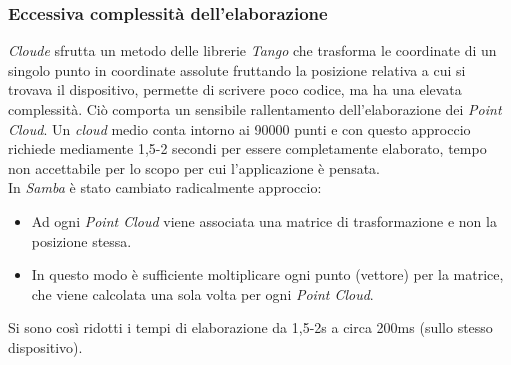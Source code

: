 \subsubsection{Eccessiva complessità dell'elaborazione}
\emph{Cloude} sfrutta un metodo delle librerie \emph{Tango} che trasforma le coordinate di un singolo punto in coordinate assolute fruttando la posizione relativa a cui si trovava il dispositivo, permette di scrivere poco codice, ma ha una elevata complessità. Ciò comporta un sensibile rallentamento dell'elaborazione dei \emph{Point Cloud}. Un \emph{cloud} medio conta intorno ai 90000 punti e con questo approccio richiede mediamente 1,5-2 secondi per essere completamente elaborato, tempo non accettabile per lo scopo per cui l'applicazione è pensata.\\
In \emph{Samba} è stato cambiato radicalmente approccio:
\begin{itemize}
	\item Ad ogni \emph{Point Cloud} viene associata una matrice di trasformazione e non la posizione stessa.
	\item In questo modo è sufficiente moltiplicare ogni punto (vettore) per la matrice, che viene calcolata una sola volta per ogni \emph{Point Cloud}. 
\end{itemize}
Si sono così ridotti i tempi di elaborazione da 1,5-2s a circa 200ms (sullo stesso dispositivo).
